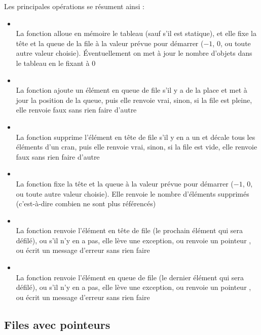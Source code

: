\documentclass[11pt,a4paper]{article}
\begin{document}
Les principales opérations se résument ainsi :
\begin{itemize}
\item {}\\
      La fonction alloue en mémoire le tableau (sauf s'il est statique), et elle fixe la tête et la queue de la file à la valeur prévue pour démarrer ($ -1 $, $ 0 $, ou toute autre valeur choisie). Éventuellement on met à jour le nombre d'objets dans le tableau en le fixant à $ 0 $
\item {}\\
      La fonction ajoute un élément en queue de file s'il y a de la place et met à jour la position de la queue, puis elle renvoie vrai, sinon, si la file est pleine, elle renvoie faux sans rien faire d'autre
\item {}\\
      La fonction supprime l'élément en tête de file s'il y en a un et décale tous les éléments d'un cran, puis elle renvoie vrai, sinon, si la file est vide, elle renvoie faux sans rien faire d'autre
\item {}\\
      La fonction fixe la tête et la queue à la valeur prévue pour démarrer ($ -1 $, $ 0 $, ou toute autre valeur choisie). Elle renvoie le nombre d'éléments supprimés (c'est-à-dire combien ne sont plus référencés)
\item {}\\
      La fonction renvoie l'élément en tête de file (le prochain élément qui sera défilé), ou s'il n'y en a pas, elle lève une exception, ou renvoie un pointeur , ou écrit un message d'erreur sans rien faire
\item {}\\
      La fonction renvoie l'élément en queue de file (le dernier élément qui sera défilé), ou s'il n'y en a pas, elle lève une exception, ou renvoie un pointeur , ou écrit un message d'erreur sans rien faire
\end{itemize}


\bigskip


\subsection{Files avec pointeurs}
\end{document}
